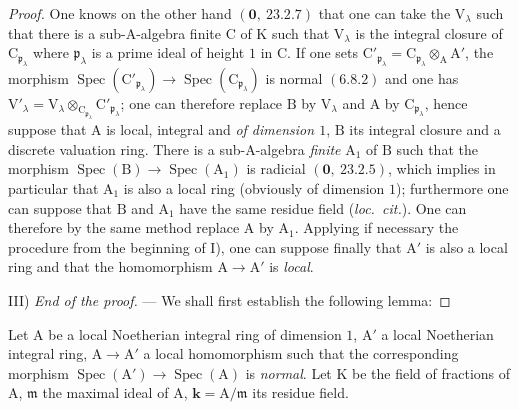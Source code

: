 \begin{proof}
One knows on the other hand $(\mathbf{0},~23.2.7)$ that one can take the $\mathrm{V}_\lambda$ such that there is a
sub-$\mathrm{A}$-algebra finite $\mathrm{C}$ of $\mathrm{K}$ such that $\mathrm{V}_\lambda$ is the integral closure of $\mathrm{C}_{\mathfrak{p}_\lambda}$ where $\mathfrak{p}_\lambda$ is a
prime ideal of height $1$ in $\mathrm{C}$. If one sets $\mathrm{C}'_{\mathfrak{p}_\lambda}=\mathrm{C}_{\mathfrak{p}_\lambda}\otimes_\mathrm{A}\mathrm{A}'$, the morphism
$\operatorname{Spec}(\mathrm{C}'_{\mathfrak{p}_\lambda})\to\operatorname{Spec}(\mathrm{C}_{\mathfrak{p}_\lambda})$ is normal $(6.8.2)$ and one has $\mathrm{V}'_\lambda=\mathrm{V}_\lambda\otimes_{\mathrm{C}_{\mathfrak{p}_\lambda}}\mathrm{C}'_{\mathfrak{p}_\lambda}$; one can therefore
replace $\mathrm{B}$ by $\mathrm{V}_\lambda$ and $\mathrm{A}$ by $\mathrm{C}_{\mathfrak{p}_\lambda}$, hence suppose that $\mathrm{A}$ is local, integral and \emph{of dimension $1$},
$\mathrm{B}$ its integral closure and a discrete valuation ring. There is a sub-$\mathrm{A}$-algebra \emph{finite} $\mathrm{A}_1$
of $\mathrm{B}$ such that the morphism $\operatorname{Spec}(\mathrm{B})\to\operatorname{Spec}(\mathrm{A}_1)$ is radicial $(\mathbf{0},~23.2.5)$, which implies
in particular that $\mathrm{A}_1$ is also a local ring (obviously of dimension $1$); furthermore
one can suppose that $\mathrm{B}$ and $\mathrm{A}_1$ have the same residue field (\emph{loc.~cit.}). One can therefore by the
same method replace $\mathrm{A}$ by $\mathrm{A}_1$. Applying if necessary the procedure from the beginning of I),
one can suppose finally that $\mathrm{A}'$ is also a local ring and that the homomorphism
$\mathrm{A}\to\mathrm{A}'$ is \emph{local}.

III) \emph{End of the proof.} --- We shall first establish the following lemma:
\end{proof}

\begin{lemma}[6.14.1.2]
\label{IV.6.14.1.2}
Let $\mathrm{A}$ be a local Noetherian integral ring of dimension $1$, $\mathrm{A}'$ a local
Noetherian integral ring, $\mathrm{A}\to\mathrm{A}'$ a local homomorphism such that the corresponding morphism
$\operatorname{Spec}(\mathrm{A}')\to\operatorname{Spec}(\mathrm{A})$ is \emph{normal}. Let $\mathrm{K}$ be the field of fractions of $\mathrm{A}$, $\mathfrak{m}$ the maximal ideal of $\mathrm{A}$,
$\boldsymbol{k}=\mathrm{A}/\mathfrak{m}$ its residue field.
\end{lemma}

